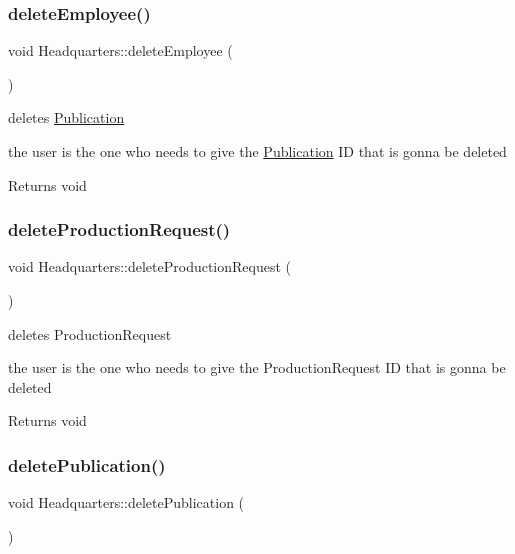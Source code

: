 \subsubsection{\texorpdfstring{delete\+Employee()}{deleteEmployee()}}
{\footnotesize\ttfamily void Headquarters\+::delete\+Employee (\begin{DoxyParamCaption}{ }\end{DoxyParamCaption})}



deletes \hyperlink{class_publication}{Publication} 

the user is the one who needs to give the \hyperlink{class_publication}{Publication} ID that is gonna be deleted

\begin{DoxyReturn}{Returns}
void 
\end{DoxyReturn}
\mbox{\label{class_headquarters_a943b8cc7b3c1c8c8a126065897512b91}} 
\subsubsection{\texorpdfstring{delete\+Production\+Request()}{deleteProductionRequest()}}
{\footnotesize\ttfamily void Headquarters\+::delete\+Production\+Request (\begin{DoxyParamCaption}{ }\end{DoxyParamCaption})}



deletes Production\+Request 

the user is the one who needs to give the Production\+Request ID that is gonna be deleted

\begin{DoxyReturn}{Returns}
void 
\end{DoxyReturn}
\mbox{\label{class_headquarters_a53dc212f35caf7e89661c0dfa000858f}} 
\subsubsection{\texorpdfstring{delete\+Publication()}{deletePublication()}}
{\footnotesize\ttfamily void Headquarters\+::delete\+Publication (\begin{DoxyParamCaption}{ }\end{DoxyParamCaption})}



